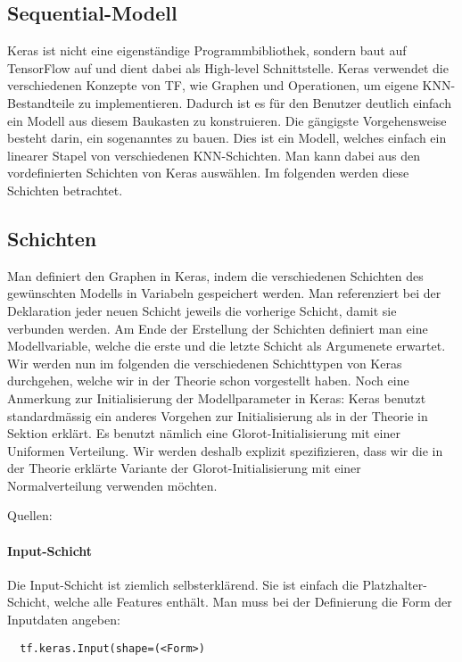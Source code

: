 \subsection{Sequential-Modell}
Keras ist nicht eine eigenständige Programmbibliothek, sondern baut auf
TensorFlow auf und dient dabei als High-level Schnittstelle.
Keras verwendet die verschiedenen Konzepte von TF, wie Graphen und Operationen,
um eigene KNN-Bestandteile zu implementieren.
Dadurch ist es für den Benutzer deutlich einfach ein Modell aus diesem Baukasten
zu konstruieren.
\para{}
Die gängigste Vorgehensweise besteht darin, ein sogenanntes
 zu bauen.
Dies ist ein Modell, welches einfach ein linearer Stapel von verschiedenen
KNN-Schichten. Man kann dabei aus den vordefinierten Schichten von Keras
auswählen. Im folgenden werden diese Schichten betrachtet.

\subsection{Schichten}
Man definiert den Graphen in Keras, indem die verschiedenen Schichten des
gewünschten Modells in Variabeln gespeichert werden. Man referenziert bei der
Deklaration jeder neuen Schicht jeweils die vorherige Schicht, damit sie
verbunden werden.
Am Ende der Erstellung der Schichten definiert man eine Modellvariable, welche
die erste und die letzte Schicht als Argumenete erwartet.
\para{}
Wir werden nun im folgenden die verschiedenen Schichttypen von Keras durchgehen, welche wir in
der Theorie schon vorgestellt haben.
\para{}
Noch eine Anmerkung zur Initialisierung der Modellparameter in Keras:
Keras benutzt standardmässig ein
anderes Vorgehen zur Initialisierung als in der Theorie in Sektion
 erklärt.
Es benutzt nämlich eine Glorot-Initialisierung mit einer Uniformen Verteilung.
Wir werden deshalb explizit spezifizieren, dass wir die in der Theorie erklärte
Variante der Glorot-Initialisierung mit einer Normalverteilung verwenden möchten.
\para{}

Quellen: \cite{net:keras_init}

\paragraph{Input-Schicht}
Die Input-Schicht ist ziemlich selbsterklärend. Sie ist einfach die
Platzhalter-Schicht, welche alle Features enthält.
Man muss bei der Definierung die Form der Inputdaten angeben:
\begin{verbatim}
  tf.keras.Input(shape=(<Form>)
\end{verbatim}

